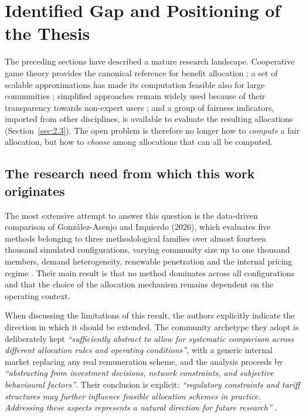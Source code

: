 \section{Identified Gap and Positioning of the Thesis}
\label{sec:gaps}

The preceding sections have described a mature research landscape. Cooperative game theory provides the canonical reference for benefit allocation \cite{shapley1953, moncecchi2020}; a set of scalable approximations has made its computation feasible also for large communities \cite{castro2009, cremers2023, alonsopedrero2024, ferrucci2025}; simplified approaches remain widely used because of their transparency towards non-expert users \cite{kulmala2021, fioriti2023}; and a group of fairness indicators, imported from other disciplines, is available to evaluate the resulting allocations (Section~\ref{sec:2.3}). The open problem is therefore no longer how to \emph{compute} a fair allocation, but how to \emph{choose} among allocations that can all be computed.

\subsection*{The research need from which this work originates}

The most extensive attempt to answer this question is the data-driven comparison of González-Asenjo and Izquierdo (2026), which evaluates five methods belonging to three methodological families over almost fourteen thousand simulated configurations, varying community size up to one thousand members, demand heterogeneity, renewable penetration and the internal pricing regime \cite{gonzalezAsenjo2026, schmeidler1969}. Their main result is that no method dominates across all configurations and that the choice of the allocation mechanism remains dependent on the operating context.

When discussing the limitations of this result, the authors explicitly indicate the direction in which it should be extended. The community archetype they adopt is deliberately kept \textit{``sufficiently abstract to allow for systematic comparison across different allocation rules and operating conditions''}, with a generic internal market replacing any real remuneration scheme, and the analysis proceeds by \textit{``abstracting from investment decisions, network constraints, and subjective behavioural factors''}. Their conclusion is explicit: \textit{``regulatory constraints and tariff structures may further influence feasible allocation schemes in practice. Addressing these aspects represents a natural direction for future research''} \cite{gonzalezAsenjo2026}.

